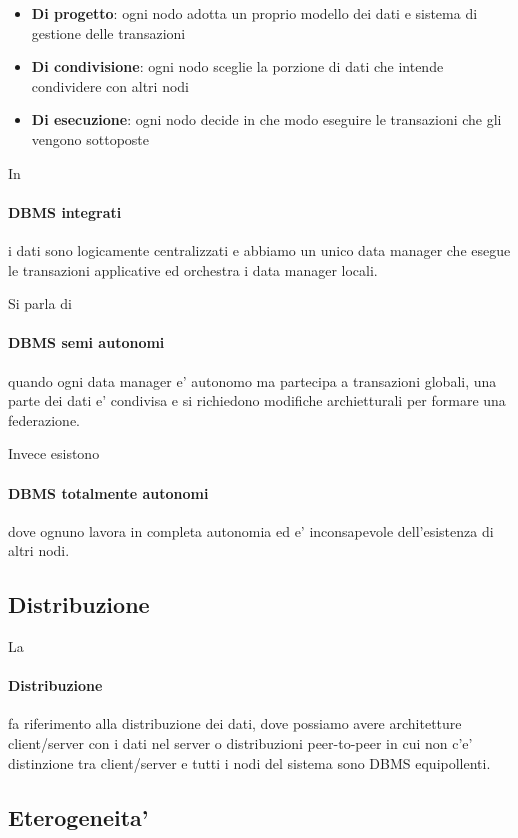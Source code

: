 \begin{itemize}
  \item \textbf{Di progetto}: ogni nodo adotta un proprio modello dei dati e sistema di gestione delle transazioni
  \item \textbf{Di condivisione}: ogni nodo sceglie la porzione di dati che intende condividere con altri nodi
  \item \textbf{Di esecuzione}: ogni nodo decide in che modo eseguire le transazioni che gli vengono sottoposte
\end{itemize}

In \paragraph{DBMS integrati} i dati sono logicamente centralizzati e abbiamo un unico data manager che esegue le transazioni applicative ed orchestra i data manager locali.

Si parla di \paragraph{DBMS semi autonomi} quando ogni data manager e' autonomo ma partecipa a transazioni globali, una parte dei dati e' condivisa e si richiedono modifiche archietturali per formare una federazione.

Invece esistono \paragraph{DBMS totalmente autonomi} dove ognuno lavora in completa autonomia ed e' inconsapevole dell'esistenza di altri nodi.

\subsection{Distribuzione}

La \paragraph{Distribuzione} fa riferimento alla distribuzione dei dati, dove possiamo avere architetture client/server con i dati nel server o distribuzioni peer-to-peer in cui non c'e' distinzione tra client/server e tutti i nodi del sistema sono DBMS equipollenti.

\subsection{Eterogeneita'}

